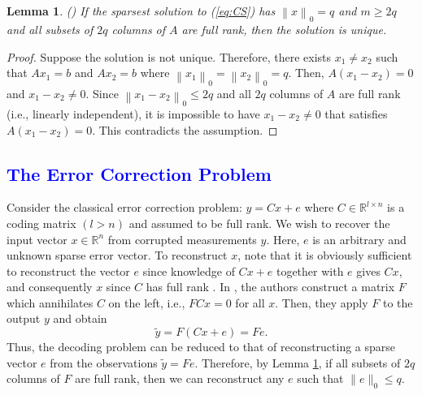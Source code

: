 \documentclass[12pt, conference, a4paper, twoside]{IEEEconf_mod}
\newcommand{\norm}[1]{\left\lVert#1\right\rVert}
\newtheorem{lem}{\bf{Lemma}}
\begin{document}
\begin{lem} (\hspace{1sp}\cite{Candes_Tao}) \label{lem:CS}
If the sparsest solution to (\ref{eq:CS}) has $\norm{x}_0 = q$ and $m\ge 2q$ and all subsets of $2q$ columns of $A$ are full rank, then the solution is unique.
\end{lem}
\begin{proof}
Suppose the solution is not unique. Therefore, there exists $x_1 \neq  x_2$ such that $Ax _1 = b$ and $Ax_2 = b$ where $\norm{x_1}_0 = \norm{x_2}_0 = q$. Then, $A(x_1 - x_2) = 0$ and $x_1 - x_2 \neq 0$. Since $\norm{x_1-x_2}_0 \leq 2q$ and all $2q$ columns of $A$ are full rank (i.e., linearly independent), it is impossible to have $x_1-x_2\neq 0$ that satisfies $A(x_1-x_2) = 0$. This contradicts the assumption.
\end{proof}


\subsection{\textcolor{blue}{The Error Correction Problem \cite{Candes_Tao}}} %
Consider the classical error correction problem: $y=Cx + e$ where $C\in \mathbb{R}^{l\times n}$ is a coding matrix $(l > n)$ and assumed to be full rank. We wish to recover the input vector $x \in \mathbb{R}^n$ from corrupted measurements $y$. Here, $e$ is an arbitrary and unknown sparse error vector. To reconstruct $x$, note that it is obviously sufficient to reconstruct the vector $e$ since knowledge of $Cx + e$ together with $e$ gives $Cx$, and consequently $x$ since $C$ has full rank \cite{Candes_Tao}. In \cite{Candes_Tao}, the authors construct a matrix $F$ which annihilates $C$ on the left, i.e.,  $FCx = 0$ for all $x$. Then, they apply $F$ to the output $y$ and obtain
\begin{equation}
	\tilde y = F (Cx + e) = Fe.
\end{equation}
Thus, the decoding problem can be reduced to that of reconstructing a sparse vector $e$ from the observations $\tilde y = Fe$. Therefore, by Lemma \ref{lem:CS}, if all subsets of $2q$ columns of $F$ are full rank, then we can reconstruct any $e$ such that $\| e \|_0 \leq q$.
\end{document}
